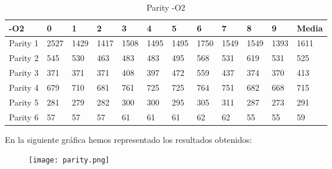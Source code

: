 \begin{table}[!htbp]
\centering
\caption{Parity -O2}
\label{my-label}
\begin{tabular}{|l|l|l|l|l|l|l|l|l|l|l|l|}\hline
-O2      & 0    & 1    & 2    & 3    & 4    & 5    & 6    & 7    & 8    & 9    & Media \\\hline
Parity 1 & 2527 & 1429 & 1417 & 1508 & 1495 & 1495 & 1750 & 1549 & 1549 & 1393 & 1611  \\\hline
Parity 2 & 545  & 530  & 463  & 483  & 483  & 495  & 568  & 531  & 619  & 531  & 525   \\\hline
Parity 3 & 371  & 371  & 371  & 408  & 397  & 472  & 559  & 437  & 374  & 370  & 413   \\\hline
Parity 4 & 679  & 710  & 681  & 761  & 725  & 725  & 764  & 751  & 682  & 668  & 715   \\\hline
Parity 5 & 281  & 279  & 282  & 300  & 300  & 295  & 305  & 311  & 287  & 273  & 291   \\\hline
Parity 6 & 57   & 57   & 57   & 61   & 61   & 61   & 62   & 62   & 55   & 55   & 59   \\\hline
\end{tabular}
\end{table}

\newpage
En la siguiente gráfica hemos representado los resultados obtenidos:

\begin{figure}[!htbp]
  \centering
  \texttt{[image: parity.png]}
\end{figure}
